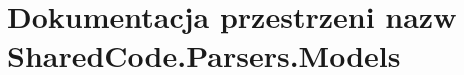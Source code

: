 \hypertarget{a00313}{}\section{Dokumentacja przestrzeni nazw Shared\+Code.\+Parsers.\+Models}
\label{a00313}
